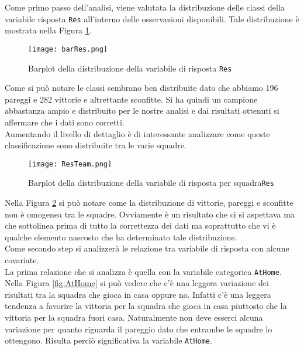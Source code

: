Come primo passo dell'analisi, viene valutata la distribuzione delle classi della variabile risposta \texttt{Res} all'interno delle osservazioni disponibili. Tale distribuzione è mostrata nella Figura \ref{fig:res}.

\begin{figure}[htbp]
	\begin{center}
		\texttt{[image: barRes.png]}
		\caption{Barplot della distribuzione della variabile di risposta \texttt{Res}} \label{fig:res}
	\end{center}
\end{figure}

Come si può notare le classi sembrano ben distribuite dato che abbiamo 196 pareggi e 282 vittorie e altrettante sconfitte. Si ha quindi un campione abbastanza ampio e distribuito per le nostre analisi e dai risultati ottenuti si affermare che i dati sono corretti.\\

Aumentando il livello di dettaglio è di interessante analizzare come queste classificazione sono distribuite tra le varie squadre.

\begin{figure}[htbp]
	\begin{center}
		\texttt{[image: ResTeam.png]}
		\caption{Barplot della distribuzione della variabile di risposta per squadra\texttt{Res}} \label{fig:team}
	\end{center}
\end{figure}

Nella Figura \ref{fig:team} si può notare come la distribuzione di vittorie, pareggi e sconfitte non è omogenea tra le squadre. Ovviamente è un risultato che ci si aspettava ma che sottolinea prima di tutto la correttezza dei dati ma soprattutto che vi è qualche elemento nascosto che ha determinato tale distribuzione.\\


Come secondo step si analizzerà le relazione tra variabile di risposta con alcune covariate.\\

La prima relazione che si analizza è quella con la variabile categorica \texttt{AtHome}. Nella Figura \ref{fig:AtHome} si può vedere che c'è una leggera variazione dei risultati tra la squadra che gioca in casa oppure no. Infatti c'è una leggera tendenza a favorire la vittoria per la squadra che gioca in casa piuttosto che la vittoria per la squadra fuori casa. Naturalmente non deve esserci alcuna variazione per quanto riguarda il pareggio dato che entrambe le squadre lo ottengono. Risulta perciò significativa la variabile \texttt{AtHome}.\\

